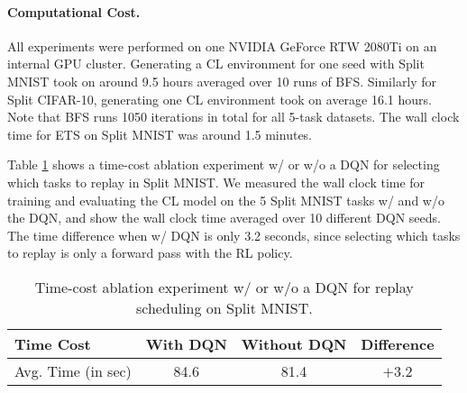 \vspace{-3mm}
\paragraph{Computational Cost.} 
All experiments were performed on one NVIDIA GeForce RTW 2080Ti on an internal GPU cluster. Generating a CL environment for one seed with Split MNIST took on around 9.5 hours averaged over 10 runs of BFS. Similarly for Split CIFAR-10, generating one CL environment took on average 16.1 hours. Note that BFS runs 1050 iterations in total for all 5-task datasets. The wall clock time for ETS on Split MNIST was around 1.5 minutes. 

Table \ref{tab:time_cost_dqn_mnist} shows a time-cost ablation experiment w/ or w/o a DQN for selecting which tasks to replay in Split MNIST. We measured the wall clock time for training and evaluating the CL model on the 5 Split MNIST tasks w/ and w/o the DQN, and show the wall clock time averaged over 10 different DQN seeds. The time difference when w/ DQN is only 3.2 seconds, since selecting which tasks to replay is only a forward pass with the RL policy.

\begin{table}[h!]
	\centering
	\caption{Time-cost ablation experiment w/ or w/o a DQN for replay scheduling on Split MNIST. }
	\vspace{-3mm}
	\begin{tabular}{lccc}
		\toprule
		Time Cost          & With DQN & Without DQN & Difference \\ \midrule
		Avg. Time (in sec) & 84.6     & 81.4        & $+$3.2   \\
		\bottomrule
	\end{tabular}
	\vspace{-1mm}
	\label{tab:time_cost_dqn_mnist}
\end{table}


\vspace{-3mm}

